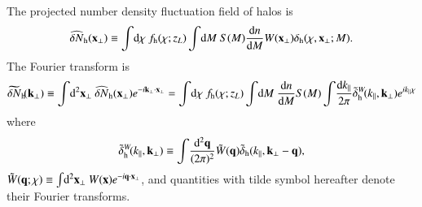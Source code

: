 \documentclass[onecolumn,notitlepage,showpacs,amsmath,amssymb,prd,floatfix]{revtex4-1}
\newcommand{\bx}{{\bf x}}
\newcommand{\bk}{{\bf k}}
\newcommand{\bq}{{\bf q}}
\newcommand{\tW}{\tilde{W}}
\newcommand{\dr}{\mathrm{d}}
\newcommand{\deltah}{\delta_{\mathrm{h}}}
\newcommand{\bh}{\mathrm{h}}
\newcommand{\bnh}{\frac{\dr n}{\dr M}}
\newcommand{\hdNh}{\widehat{\delta N}_{\rm h}}
\newcommand{\tdsigmah}{\widetilde{\delta N}_{\rm h}\!}
\newcommand{\tdeltah}{\tilde{\delta}_{\rm h}}
\begin{document}
The projected number density fluctuation field of halos is
%
\begin{equation}
 \hdNh(\bx_\perp)\equiv
  \int\!\dr\chi~f_\bh(\chi;z_L)
  \int\!\dr M~S(M)\bnh
  W(\bx_\perp)\deltah(\chi,\bx_\perp; M).
\end{equation}
%
The Fourier transform is
%
\begin{equation}
 \tdsigmah(\bk_\perp)\equiv \int\!\dr^2\bx_\perp~ \hdNh(\bx_\perp)e^{-i\bk_\perp\cdot\bx_\perp}
  =\int\!\dr\chi~f_\bh(\chi;z_L)\int\!\dr M~\bnh S(M)\int\!\frac{\dr k_\parallel}{2\pi}
  \tdeltah^W\!(k_\parallel,\bk_\perp)e^{ik_\parallel\chi}
\end{equation}
%
where 
%
\begin{equation}
  \tdeltah^W\!(k_\parallel,\bk_\perp)\equiv 
  \int\!\frac{\dr^2\bq}{(2\pi)^2}\tW(\bq)
  \tdeltah(k_\parallel,\bk_\perp-\bq),
\end{equation}
%
$\tW(\bq;\chi)\equiv
\int\!\dr^2\bx_\perp~W(\bx)e^{-i\bq\cdot\bx_\perp}$, and
quantities with tilde symbol hereafter denote their Fourier
transforms.
\end{document}
